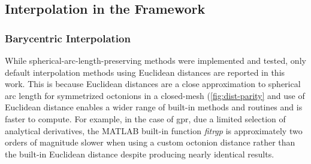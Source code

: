 \documentclass[preprint,12pt]{elsarticle}
\begin{document}
\subsection{Interpolation in the  Framework}
\label{sec:methods:interp}

\subsubsection{Barycentric Interpolation}
\label{sec:methods:interp:bary}



While spherical-arc-length-preserving methods were implemented and tested, only default interpolation methods using Euclidean distances are reported in this work. This is because Euclidean distances are a close approximation to spherical arc length for symmetrized octonions in a closed-mesh (\cref{fig:dist-parity} and use of Euclidean distance enables a wider range of built-in methods and routines and is faster to compute. For example, in the case of \gls{gpr}, due a limited selection of analytical derivatives, the MATLAB built-in function \textit{fitrgp} is approximately two orders of magnitude slower when using a custom octonion distance rather than the built-in Euclidean distance despite producing nearly identical results.
\end{document}
